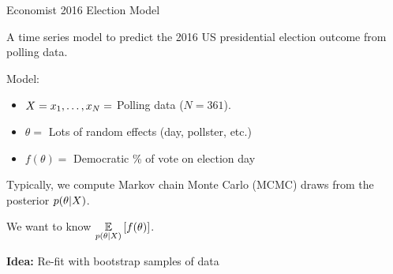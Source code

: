 
\begin{frame}{Economist 2016 Election Model \citep{economist:2020:election}}

\begin{minipage}[t]{0.4\textwidth}
    \ElectionData{}
\end{minipage}
\begin{minipage}[t]{0.59\textwidth}

A time series model to predict the 2016 US presidential election
outcome from polling data.

\spskip
Model:
\begin{itemize}
\item $X = x_1, \ldots, x_N =$ Polling data ($N = 361$).
\item $\theta = $ Lots of random effects (day, pollster, etc.)
\item $f(\theta) = $ Democratic \% of vote on election day
\end{itemize}

\spskip
Typically, we compute Markov chain Monte Carlo (MCMC) draws from the
posterior $p(\theta \vert X)$.

\spskip
We want to know $\underset{p(\theta \vert X)}{\mathbb{E}}\left[f(\theta)\right]$.

\end{minipage}


\pause


        
\textbf{Idea: } Re-fit with bootstrap samples of data \citep{huggins:2023:bayesbag}

%

\pause
{}

\end{frame}






